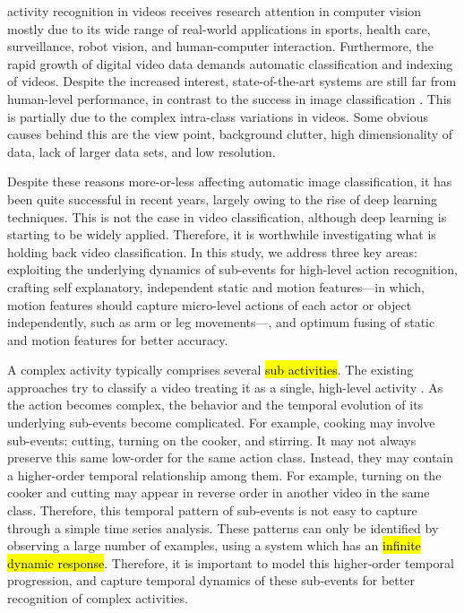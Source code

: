   
 activity recognition in videos receives research attention
in computer vision mostly due to its wide range of real-world applications in
sports, health care, surveillance, robot vision, and human-computer interaction.
Furthermore, the rapid growth of digital video data demands automatic
classification and indexing of videos. Despite the increased interest, state-of-the-art
systems are still far from human-level performance, in contrast to the success in image classification \cite{girshick2014rich, krizhevsky2012imagenet}. This is partially due to the complex intra-class variations in videos. Some
obvious causes behind this are the view point, background
clutter, high dimensionality of data, lack of larger data sets, and low resolution.

Despite these reasons more-or-less affecting automatic image classification, it has been quite successful in recent years,
largely owing to the rise of deep learning techniques. This is not the case in video classification, although deep learning is 
starting to be widely applied. Therefore, it is worthwhile investigating
what is holding back video classification. In this study, we address three key
areas: exploiting the underlying dynamics of sub-events for high-level action recognition, crafting
self explanatory, independent static and motion features---in which, motion features should capture micro-level actions
of each actor or object independently, such as arm or leg movements---, and optimum fusing of static and motion features for better accuracy.

A complex activity typically comprises several \hl{sub activities}.
The existing approaches try to classify a video treating it as a
single, high-level activity \cite{wang2011action, wang2013action, simonyan2014two, 7486474}.
As the action becomes complex, the behavior and the
temporal evolution of its underlying sub-events become complicated. For example,
cooking may involve sub-events: cutting, turning on the cooker, and stirring. It may not always preserve this
same low-order for the same action class. Instead, they may contain
a higher-order temporal relationship among them. For example, turning on the cooker and cutting
may appear in reverse order in another video in the same class.
Therefore, this temporal pattern of sub-events is not easy to capture through a simple
time series analysis. These patterns can only be identified by observing a large number
of examples, using a system which has an \hl{infinite dynamic response}. Therefore, it is important to
model this higher-order temporal
progression, and capture temporal dynamics of these sub-events for better recognition of
complex activities.


